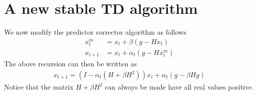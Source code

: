 \section{A new stable TD algorithm}
We now modify the predictor corrector algorithm as follows
\begin{align}
x^m_{t}&=x_t+\beta(g-Hx_t)\\
x_{t+1}&=x_t+\alpha_t(g-Hx^m_t)
\end{align} 
The above recursion can then be written as
\begin{align}
x_{t+1}= (I-\alpha_t (H+\beta H^2))x_t+\alpha_t(g-\beta H g)
\end{align}
Notice that the matrix $H+\beta H^2$ can always be made have all real values positive.
\begin{example}
\end{example}
